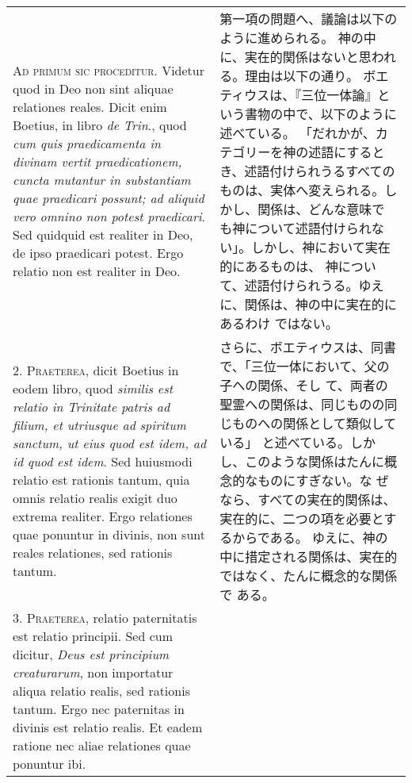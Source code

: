 \documentclass[10pt]{jsarticle} %
\begin{document}
\begin{longtable}{p{21em}p{21em}}




{\Huge A}{\scshape d primum sic proceditur}. Videtur quod in Deo non sint aliquae
relationes reales. Dicit enim Boetius, in libro {\itshape de Trin}., quod {\itshape cum quis
praedicamenta in divinam vertit praedicationem, cuncta mutantur in
substantiam quae praedicari possunt; ad aliquid vero omnino non potest
praedicari}. Sed quidquid est realiter in Deo, de ipso praedicari
potest. Ergo relatio non est realiter in Deo.


&

第一項の問題へ、議論は以下のように進められる。
神の中に、実在的関係はないと思われる。理由は以下の通り。
ボエティウスは、『三位一体論』という書物の中で、以下のように述べている。
「だれかが、カテゴリーを神の述語にするとき、述語付けられうるすべてのものは、実体へ変えられる。しかし、関係は、どんな意味で
 も神について述語付けられない」。しかし、神において実在的にあるものは、
 神について、述語付けられうる。ゆえに、関係は、神の中に実在的にあるわけ
 ではない。




\\



2. {\scshape Praeterea}, dicit Boetius in eodem libro, quod {\itshape similis est relatio in
Trinitate patris ad filium, et utriusque ad spiritum sanctum, ut eius
quod est idem, ad id quod est idem}. Sed huiusmodi relatio est rationis
tantum, quia omnis relatio realis exigit duo extrema realiter. Ergo
relationes quae ponuntur in divinis, non sunt reales relationes, sed
rationis tantum.


&

さらに、ボエティウスは、同書で、「三位一体において、父の子への関係、そし
 て、両者の聖霊への関係は、同じものの同じものへの関係として類似している」
 と述べている。しかし、このような関係はたんに概念的なものにすぎない。な
 ぜなら、すべての実在的関係は、実在的に、二つの項を必要とするからである。
 ゆえに、神の中に措定される関係は、実在的ではなく、たんに概念的な関係で
 ある。

\\



3. {\scshape Praeterea}, relatio paternitatis est relatio principii. Sed cum dicitur,
{\itshape Deus est principium creaturarum}, non importatur aliqua relatio realis,
sed rationis tantum. Ergo nec paternitas in divinis est relatio
realis. Et eadem ratione nec aliae relationes quae ponuntur ibi.



\end{longtable}
\end{document}
